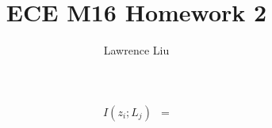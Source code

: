 \documentclass[12pt]{article}
\title{ECE M16 Homework 2}
\author{Lawrence Liu}
\begin{document}
\begin{align*}
    I(z_i;L_j)&=
\end{align*}
\end{document}
